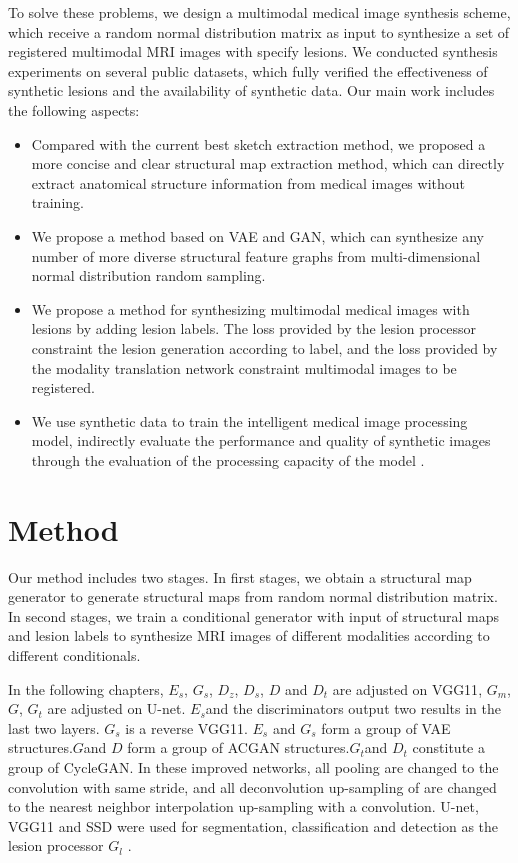 \documentclass[runningheads]{llncs}
\begin{document}
	To solve these problems, we design a multimodal medical image synthesis scheme, which receive a random normal distribution matrix as input to synthesize a set of registered multimodal MRI images with specify lesions. We conducted synthesis experiments on several public datasets, which fully verified the effectiveness of synthetic lesions and the availability of synthetic data. Our main work includes the following aspects:
	\begin{itemize}
		\item Compared with the current best sketch extraction method, we proposed a more concise and clear structural map extraction method, which can directly extract anatomical structure information from medical images without training.
		
		\item We propose a method based on VAE and GAN, which can synthesize any number of more diverse structural feature graphs from multi-dimensional normal distribution random sampling.
		
		\item We propose a method for synthesizing multimodal medical images with lesions by adding lesion labels. The loss provided by the lesion processor constraint the lesion generation according to label, and the loss provided by the modality translation network constraint multimodal images to be registered.
		
		\item We use synthetic data to train the intelligent medical image processing model, indirectly evaluate the performance and quality of synthetic images through the evaluation of the processing capacity of the model .
	\end{itemize}
	
	\section{Method}
	\label{method}
	Our method includes two stages. In first stages, we obtain a structural map generator to generate structural maps from random normal distribution matrix. In second stages, we train a conditional generator with input of structural maps and lesion labels to synthesize MRI images of different modalities according to different conditionals.
	
	In the following chapters, $E_s $, $G_s$, $D_{z} $, $D_{s} $, $D $ and $D_{t}$ are adjusted on VGG11\cite{102simonyan2014very}, $G_m $, $G$, $G_t$ are adjusted on U-net\cite{6zhu2017unpaired}. $E_s$and the discriminators output two results in the last two layers. $G_s$ is a reverse VGG11. $E_s $ and $G_s$ form a group of VAE\cite{88rezende2014stochastic} structures.$G$and $D$ form a group of ACGAN\cite{98odena2016conditional} structures.$G_t$and $D_t $ constitute a group of CycleGAN. In these improved networks, all pooling are changed to the convolution with same stride, and all deconvolution up-sampling of are changed to the nearest neighbor interpolation up-sampling with a convolution. U-net, VGG11 and SSD\cite{109liu2016ssd:} were used for segmentation, classification and detection as the lesion processor $G_l$ .
\end{document}
